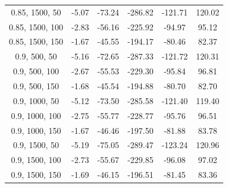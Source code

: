 \documentclass[
]{article}
\begin{document}
\begin{table}[H]
{\begin{tabular}{|c|c|c|c|c|c|}
                0.85, 1500, 50             & -5.07                      & -73.24                     & -286.82                    & -121.71                  & 120.02                  \\
                0.85, 1500, 100            & -2.83                      & -56.16                     & -225.92                    & -94.97                   & 95.12                   \\
                0.85, 1500, 150            & -1.67                      & -45.55                     & -194.17                    & -80.46                   & 82.37                   \\
                0.9, 500, 50               & -5.16                      & -72.65                     & -287.33                    & -121.72                  & 120.31                  \\
                0.9, 500, 100              & -2.67                      & -55.53                     & -229.30                    & -95.84                   & 96.81                   \\
                0.9, 500, 150              & -1.68                      & -45.54                     & -194.88                    & -80.70                   & 82.70                   \\
                0.9, 1000, 50              & -5.12                      & -73.50                     & -285.58                    & -121.40                  & 119.40                  \\
                0.9, 1000, 100             & -2.75                      & -55.77                     & -228.77                    & -95.76                   & 96.51                   \\
                0.9, 1000, 150             & -1.67                      & -46.46                     & -197.50                    & -81.88                   & 83.78                   \\
                0.9, 1500, 50              & -5.19                      & -75.05                     & -289.47                    & -123.24                  & 120.96                  \\
                0.9, 1500, 100             & -2.73                      & -55.67                     & -229.85                    & -96.08                   & 97.02                   \\
                0.9, 1500, 150             & -1.69                      & -46.15                     & -196.51                    & -81.45                   & 83.36                   \\

\end{tabular}}
\end{table}
\end{document}
